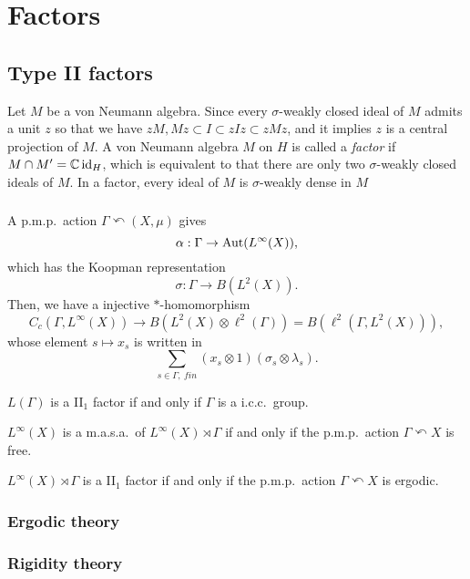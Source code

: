 \documentclass{../../large}
\begin{document}
\part{Factors}

\chapter{Type II factors}

\begin{prb}
Let $M$ be a von Neumann algebra.
Since every $\sigma$-weakly closed ideal of $M$ admits a unit $z$ so that we have $zM,Mz\subset I\subset zIz\subset zMz$, and it implies $z$ is a central projection of $M$.
A von Neumann algebra $M$ on $H$ is called a \emph{factor} if $M\cap M'=\mathbb{C}\operatorname{id}_H$, which is equivalent to that there are only two $\sigma$-weakly closed ideals of $M$.
In a factor, every ideal of $M$ is $\sigma$-weakly dense in $M$
\end{prb}


\section{}
\begin{prb}
A p.m.p.~action $\Gamma\curvearrowleft(X,\mu)$ gives
\[\alpha:\Gamma\to\operatorname{Aut}(L^\infty(X)),\]
which has the Koopman representation
\[\sigma:\Gamma\to B(L^2(X)).\]
Then, we have a injective $*$-homomorphism
\[C_c(\Gamma,L^\infty(X))\to B(L^2(X)\otimes\ell^2(\Gamma))=B(\ell^2(\Gamma,L^2(X))),\]
whose element $s\mapsto x_s$ is written in
\[\sum_{s\in\Gamma,\ fin}(x_s\otimes1)(\sigma_s\otimes\lambda_s).\]

\begin{parts}
\item $L(\Gamma)$ is a II$_1$ factor if and only if $\Gamma$ is a i.c.c.~group.
\item $L^\infty(X)$ is a m.a.s.a.~of $L^\infty(X)\rtimes\Gamma$ if and only if the p.m.p.~action $\Gamma\curvearrowleft X$ is free.
\item $L^\infty(X)\rtimes\Gamma$ is a II$_1$ factor if and only if the p.m.p.~action $\Gamma\curvearrowleft X$ is ergodic.
\end{parts}
\end{prb}


\section{Ergodic theory}
\section{Rigidity theory}
\end{document}

